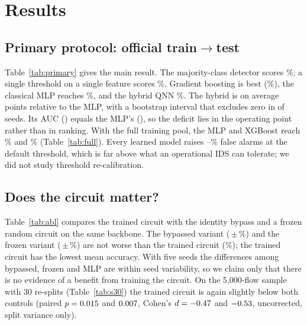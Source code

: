 \IfFileExists{IEEEtran.cls}{\documentclass[conference]{IEEEtran}}{\documentclass[10pt,twocolumn]{article}\usepackage[margin=0.8in]{geometry}}
\newcommand{\fit}[1]{\resizebox{\ifdim\width>\columnwidth\columnwidth\else\width\fi}{!}{#1}}
\begin{document}
\section{Results}
\subsection{Primary protocol: official train$\to$test}
Table~\ref{tab:primary} gives the main result. The majority-class detector scores \accMaj\%; a single threshold on a single feature scores \accStump\%. Gradient boosting is best (\accXgb\%), the classical MLP reaches \accMlp\%, and the hybrid QNN \accHqnn\%. The hybrid is on average \bootDiffHqnnMlp{} points relative to the MLP, with a bootstrap interval that excludes zero in \bootExcludeZero{} of \bootSeeds{} seeds. Its AUC (\aucHqnn) equals the MLP's (\aucMlp), so the deficit lies in the operating point rather than in ranking. With the full training pool, the MLP and XGBoost reach \accMlpFull\% and \accXgbFull\% (Table~\ref{tab:full}). Every learned model raises \fprXgb--\fprHqnn\% false alarms at the default threshold, which is far above what an operational IDS can tolerate; we did not study threshold re-calibration.

\begin{table}[t]\centering\caption{Official train$\to$test, de-duplicated, 30{,}000 training flows per seed, five seeds.}\label{tab:primary}\small
\fit{}\end{table}

\begin{table}[t]\centering\caption{Same protocol, full de-duplicated training pool (classical models only).}\label{tab:full}\small
\fit{}\end{table}

\subsection{Does the circuit matter?}
Table~\ref{tab:abl} compares the trained circuit with the identity bypass and a frozen random circuit on the same backbone. The bypassed variant (\accByp\,$\pm$\,\accSdByp\%) and the frozen variant (\accFrz\,$\pm$\,\accSdFrz\%) are not worse than the trained circuit (\accHqnn\%); the trained circuit has the lowest mean accuracy. With five seeds the differences among bypassed, frozen and MLP are within seed variability, so we claim only that there is no evidence of a benefit from training the circuit. On the 5{,}000-flow sample with 30 re-splits (Table~\ref{tab:s30}) the trained circuit is again slightly below both controls (paired $p=0.015$ and $0.007$, Cohen's $d=-0.47$ and $-0.53$, uncorrected, split variance only).
\end{document}
